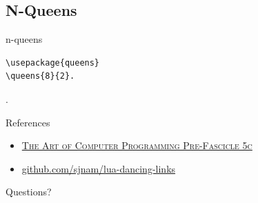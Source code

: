 \documentclass[xcolor=svgnames]{beamer}
\begin{document}
\subsection{N-Queens}

%
\begin{frame}[fragile]{n-queens}
\begin{verbatim}
\usepackage{queens}
\queens{8}{2}.
\end{verbatim}
\vspace{-10mm}
.
\end{frame}


%
\begin{frame}{References}
  \begin{itemize}
  \item \href{http://www-cs-faculty.stanford.edu/~knuth/fasc5c.ps.gz}
    {\textsc{The Art of Computer Programming Pre-Fascicle 5c}}
  \item \href{https://github.com/sjnam/lua-dancing-links}
    {github.com/sjnam/lua-dancing-links}
  \end{itemize}
\end{frame}

%
\begin{frame}[standout]
  Questions?
\end{frame}
\end{document}
